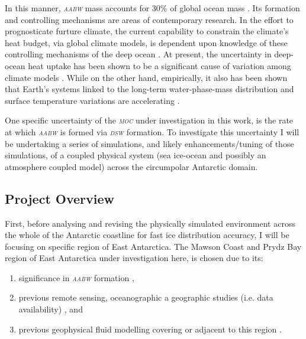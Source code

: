 \documentclass[11pt,a4paper]{article}
\newcommand{\moc}{\textit{\textsc{moc }}} %
\newcommand{\dsw}{\textit{\textsc{{dsw }}}} %
\newcommand{\aabw}{\textit{\textsc{{aabw }}}} %
\begin{document}
In this manner, \aabw mass accounts for 30\% of global ocean
mass \citep{johnsonQuantifyingAntarcticBottom2008}. Its formation and controlling mechanisms are
areas of contemporary research. In the effort to prognosticate furture
climate, the current capability to constrain the climate's heat
budget, via global climate models, is dependent upon knowledge of
these controlling mechanisms of the deep ocean
\citep{dominguesImprovedEstimatesUpperocean2008,murphyObservationallyBasedEnergy2009,purkeyGlobalContractionAntarctic2012,durackOceanWarmingSurface2018}. At
present, the uncertainty in deep-ocean heat uptake has been shown to be a
significant cause of variation among climate models
\citep{boeDeepOceanHeat2009,durackOceanWarmingSurface2018}. While on the other hand, empirically, it
also has been shown that Earth's systems linked to the long-term
water-phase-mass distribution and surface temperature variations are
accelerating \citep{murphyObservationallyBasedEnergy2009,portnerIPCCSpecialReport2019}.

One specific uncertainty of the \moc under investigation in this work,
is the rate at which \aabw is formed via \dsw formation. To
investigate this uncertainty I will be undertaking a series of
simulations, and likely enhancements/tuning of those simulations, of a
coupled physical system (sea ice-ocean and possibly an atmosphere
coupled model) across the circumpolar Antarctic domain.

\subsection{Project Overview}
\label{sec:org82f9140}

First, before analysing and revising the physically simulated
environment across the whole of the Antarctic coastline for fast ice
distribution accuracy, I will be focusing on specific region of East
Antarctica. The Mawson Coast and Prydz Bay region of East Antarctica under investigation here, is chosen due to its:
\begin{enumerate}
\item significance in \aabw formation
  \citep{williamsSurfaceOceanographyBROKEWest2010,ohshimaGlobalViewSeaice2016,tamuraSeaIceProduction2016,williamsg.d.SuppressionAntarcticBottom,fraserLandfastIceControls2019,aokiFresheningAntarcticBottom2020},
\item previous remote sensing, oceanographic a geographic studies (i.e. data availability)
  \citep{meijersCirculationWaterMasses2010,williamsSurfaceOceanographyBROKEWest2010,ohshimaAntarcticBottomWater2013,tamuraSeaIceProduction2016,fraserLandfastIceControls2019,aokiFresheningAntarcticBottom2020,smithCapeDarnleyBathymetry2020},
  and
\item previous geophysical fluid modelling covering or adjacent to this region
  \citep{galton-fenziModelingBasalMelting2012,nakayamaNumericalInvestigationFormation2014,liuModelingModifiedCircumpolar2017,kusaharaModelingOceanCryosphere2017,kusaharaDenseShelfWater2017,naughtenIntercomparisonAntarcticIceshelf2018,vanachterModellingLandfastSea2022}.
\end{enumerate}
\end{document}
